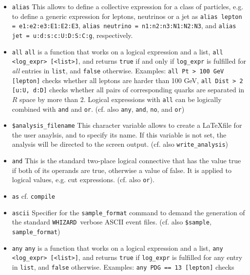 \documentclass[12pt]{book}
\newcommand{\ttt}[1]{\texttt{#1}}
\newcommand{\whizard}{\texttt{WHIZARD}}
\begin{document}
\begin{itemize}
\item 
\ttt{alias} \newline
This allows to define a collective expression for a class of
particles, e.g. to define a generic expression for leptons, neutrinos
or a jet as \ttt{alias lepton = e1:e2:e3:E1:E2:E3}, \ttt{alias
  neutrino = n1:n2:n3:N1:N2:N3}, and \ttt{alias jet =
  u:d:s:c:U:D:S:C:g}, respectively.
\item 
\ttt{all} \newline
\ttt{all} is a function that works on a logical expression and a list, 
\ttt{all <log\_expr> [<list>]}, and returns \ttt{true} if and only if
\ttt{log\_expr} is fulfilled for {\em all} entries in \ttt{list}, and
\ttt{false} otherwise. Examples: \ttt{all Pt > 100 GeV [lepton]}
checks whether all leptons are harder than 100 GeV, \ttt{all Dist > 2
  [u:U, d:D]} checks whether all pairs of corresponding quarks
are separated in $R$ space by more than 2. Logical expressions with
\ttt{all} can be logically combined with \ttt{and} and
\ttt{or}. (cf. also \ttt{any}, \ttt{and}, \ttt{no}, and \ttt{or}) 
\item 
\ttt{\$analysis\_filename} \newline
This character variable allows to create a \LaTeX file for the user
anaylsis, and to specify its name. If this variable is not set, the
analysis will be directed to the screen output. (cf. also 
\ttt{write\_analysis})
\item
\ttt{and} \newline
This is the standard two-place logical connective that has the value
true if both of its operands are true, otherwise a value of false. It
is applied to logical values, e.g. cut expressions. (cf. also \ttt{or}).
\item
\ttt{as} \newline
cf. \ttt{compile}
\item
\ttt{ascii} \newline 
Specifier for the \ttt{sample\_format} command to demand the
generation of the standard \whizard\ verbose ASCII event
files. (cf. also \ttt{\$sample}, 
\ttt{sample\_format}) 
\item
\ttt{any} \newline
\ttt{any} is a function that works on a logical expression and a list, 
\ttt{any <log\_expr> [<list>]}, and returns \ttt{true} if
\ttt{log\_expr} is fulfilled for any entry in \ttt{list}, and
\ttt{false} otherwise. Examples: \ttt{any PDG == 13 [lepton]} checks

\end{itemize}
\end{document}
